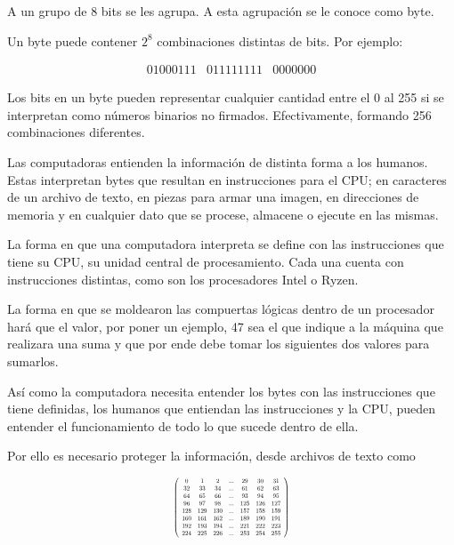 \documentclass[a4paper]{article}
\newcommand*{\Scale}[2][4]{\scalebox{#1}{$#2$}}%
\begin{document}
A un grupo de 8 bits se les agrupa. A esta agrupación se le conoce como byte.

Un byte puede contener $2^8$ combinaciones distintas de bits. Por ejemplo:

\[
\begin{array}{ccc}
    01000111 & 011111111 & 0000000
\end{array}
\]

Los bits en un byte pueden representar cualquier cantidad entre el 0 al 255 si
se interpretan como números binarios no firmados. Efectivamente, formando 256
combinaciones diferentes.

Las computadoras entienden la información de distinta forma a los humanos.
Estas interpretan bytes que resultan en instrucciones para el CPU; en
caracteres de 
un archivo de texto, en piezas para armar una imagen, en direcciones de memoria
y en cualquier dato que se procese, almacene o ejecute en las mismas.

La forma en que una computadora interpreta se define con las instrucciones que
tiene su CPU, su unidad central de procesamiento. 
Cada una cuenta con instrucciones distintas, como son los procesadores Intel o
Ryzen.

La forma en que se moldearon las compuertas lógicas dentro de un procesador
hará que el valor, por poner un ejemplo, 47 sea el que 
indique a la máquina que realizara una suma y que por ende debe tomar los
siguientes dos valores para sumarlos.

Así como la computadora necesita entender los bytes con las instrucciones que
tiene definidas, los humanos que entiendan las instrucciones 
y la CPU, pueden entender el funcionamiento de todo lo que sucede dentro de
ella.

Por ello es necesario proteger la información, desde archivos de texto como 


\[
\Scale[0.5]{
\left(
\begin{array}{ccccccccc}
 0 & 1 & 2 & ... & 29 & 30 & 31 \\
 32 & 33 & 34 & ... & 61 & 62 & 63
\\
 64 & 65 & 66 & ... & 93 & 94 & 95
\\
 96 & 97 & 98 & ... & 125 & 126 & 127 \\
 128 & 129 & 130 & ... & 157 & 158 & 159 \\
 160 & 161 & 162 & ... & 189 & 190 & 191 \\
 192 & 193 & 194 & ... & 221 & 222 & 223 \\
 224 & 225 & 226 & ... & 253 & 254 & 255 \\
\end{array}
\right)
}
\]
\end{document}
